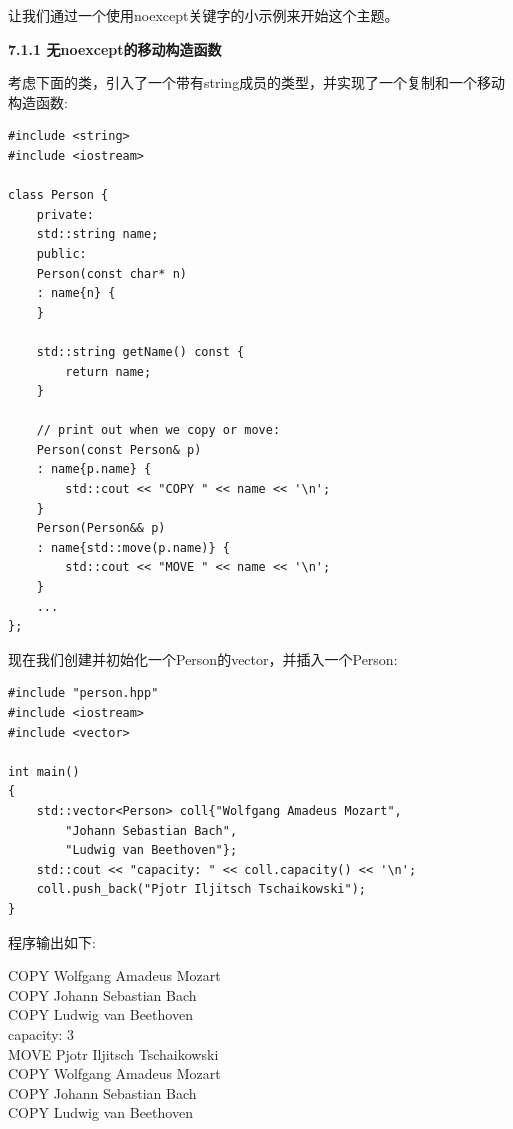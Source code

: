 让我们通过一个使用noexcept关键字的小示例来开始这个主题。\par

\hspace*{\fill} \par %
\textbf{7.1.1 无noexcept的移动构造函数}

考虑下面的类，引入了一个带有string成员的类型，并实现了一个复制和一个移动构造函数:\par

{\color{red}{basics/person.hpp}}\par

\begin{lstlisting}[caption={}]
#include <string>
#include <iostream>

class Person {
	private:
	std::string name;
	public:
	Person(const char* n)
	: name{n} {
	}

	std::string getName() const {
		return name;
	}

	// print out when we copy or move:
	Person(const Person& p)
	: name{p.name} {
		std::cout << "COPY " << name << '\n';
	}
	Person(Person&& p)
	: name{std::move(p.name)} {
		std::cout << "MOVE " << name << '\n';
	}
	...
};
\end{lstlisting}

现在我们创建并初始化一个Person的vector，并插入一个Person:\par

{\color{red}{basics/person.cpp}}\par

\begin{lstlisting}[caption={}]
#include "person.hpp"
#include <iostream>
#include <vector>

int main()
{
	std::vector<Person> coll{"Wolfgang Amadeus Mozart",
		"Johann Sebastian Bach",
		"Ludwig van Beethoven"};
	std::cout << "capacity: " << coll.capacity() << '\n';
	coll.push_back("Pjotr Iljitsch Tschaikowski");
}
\end{lstlisting}

程序输出如下:\par

\begin{tcolorbox}[colback=white,colframe=black]
COPY Wolfgang Amadeus Mozart \\
COPY Johann Sebastian Bach \\
COPY Ludwig van Beethoven \\
capacity: 3 \\
MOVE Pjotr Iljitsch Tschaikowski \\
COPY Wolfgang Amadeus Mozart \\
COPY Johann Sebastian Bach \\
COPY Ludwig van Beethoven
\end{tcolorbox}

